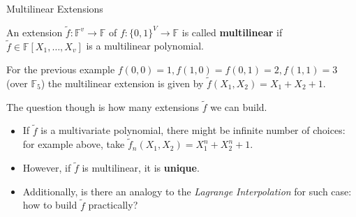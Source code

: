 \documentclass{zkdl-presentation-template}
\begin{document}
    \begin{frame}{Multilinear Extensions}
        \begin{definition}[MLE]
            An extension $\widetilde{f}: \mathbb{F}^v \to \mathbb{F}$ of $f:
            \{0,1\}^V \to \mathbb{F}$ is called \textbf{multilinear} if
            $\widetilde{f} \in \mathbb{F}[X_1,\dots,X_v]$ is a multilinear
            polynomial.\pause
        \end{definition}

        \begin{example}
            For the previous example $f(0,0)=1, f(1,0)=f(0,1)=2, f(1,1)=3$
            (over $\mathbb{F}_5$) the multilinear extension is given by
            $\widetilde{f}(X_1,X_2) = X_1 + X_2 + 1$.\pause
        \end{example}

        The question though is how many extensions $\widetilde{f}$ we can 
        build.
        \begin{itemize}
            \item If $\widetilde{f}$ is a multivariate polynomial, there might
            be infinite number of choices: for example above, take
            $\widetilde{f}_n(X_1,X_2) = X_1^n + X_2^n + 1$.\pause
            \item However, if $\widetilde{f}$ is multilinear, it is
            \textbf{unique}.\pause
            \item Additionally, is there an analogy to the \textit{Lagrange
            Interpolation} for such case: how to build $\widetilde{f}$
            practically?
        \end{itemize}
    \end{frame}
\end{document}
